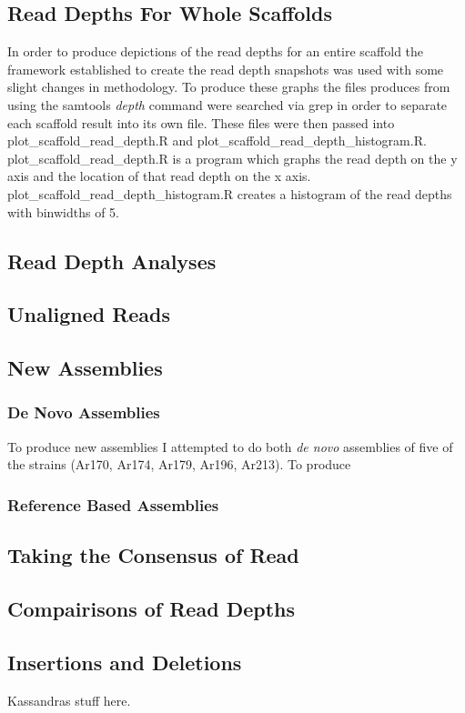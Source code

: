 \documentclass[../main.tex]{subfiles}
\begin{document}
\subsection{Read Depths For Whole Scaffolds}
	In order to produce depictions of the read depths for an entire scaffold the framework established to create the read depth snapshots was used with some slight changes in methodology. To produce these graphs the files produces from using the samtools \textit{depth} command were searched via grep in order to separate each scaffold result into its own file. These files were then passed into plot\_scaffold\_read\_depth.R and plot\_scaffold\_read\_depth\_histogram.R. plot\_scaffold\_read\_depth.R is a program which graphs the read depth on the y axis and the location of that read depth on the x axis. plot\_scaffold\_read\_depth\_histogram.R creates a histogram of the read depths with binwidths of 5. %

\subsection{Read Depth Analyses}
	
\subsection{Unaligned Reads}
	
\subsection{New Assemblies}
	\subsubsection{De Novo Assemblies}
	To produce new assemblies I attempted to do both \textit{de novo} assemblies of five of the strains (Ar170, Ar174, Ar179, Ar196, Ar213). To produce 
	\subsubsection{Reference Based Assemblies}


\subsection{Taking the Consensus of Read}

\subsection{Compairisons of Read Depths}

\subsection{Insertions and Deletions}

	Kassandras stuff here.
\end{document}
